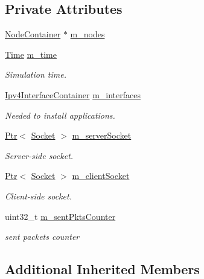 \subsection*{Private Attributes}
\begin{DoxyCompactItemize}
\item 
\hyperlink{classns3_1_1NodeContainer}{Node\+Container} $\ast$ \hyperlink{classFlameRegressionTest_a86bffb878b688af7c76815e44edc8f1a}{m\+\_\+nodes}
\item 
\hyperlink{classns3_1_1Time}{Time} \hyperlink{classFlameRegressionTest_a091f31a70bd540a33a5a182b85df03de}{m\+\_\+time}
\begin{DoxyCompactList}\small\item\em Simulation time. \end{DoxyCompactList}\item 
\hyperlink{classns3_1_1Ipv4InterfaceContainer}{Ipv4\+Interface\+Container} \hyperlink{classFlameRegressionTest_ac7f8b22e0f903c6ea767e9dba2d3bed3}{m\+\_\+interfaces}
\begin{DoxyCompactList}\small\item\em Needed to install applications. \end{DoxyCompactList}\item 
\hyperlink{classns3_1_1Ptr}{Ptr}$<$ \hyperlink{classns3_1_1Socket}{Socket} $>$ \hyperlink{classFlameRegressionTest_a9b6074ea583c3c1f7401fb47c05cd34e}{m\+\_\+server\+Socket}
\begin{DoxyCompactList}\small\item\em Server-\/side socket. \end{DoxyCompactList}\item 
\hyperlink{classns3_1_1Ptr}{Ptr}$<$ \hyperlink{classns3_1_1Socket}{Socket} $>$ \hyperlink{classFlameRegressionTest_a68f248c38efe4db3cc4cd288e5d0b331}{m\+\_\+client\+Socket}
\begin{DoxyCompactList}\small\item\em Client-\/side socket. \end{DoxyCompactList}\item 
uint32\+\_\+t \hyperlink{classFlameRegressionTest_afd9230653770d041f6b34880ecc57459}{m\+\_\+sent\+Pkts\+Counter}
\begin{DoxyCompactList}\small\item\em sent packets counter \end{DoxyCompactList}\end{DoxyCompactItemize}
\subsection*{Additional Inherited Members}


